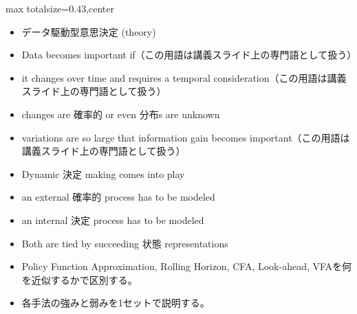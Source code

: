 \clearpage
{}
\begin{minipage}[t]{0.405\textwidth}
\begin{adjustbox}{max totalsize={\textwidth}{0.43\textheight},center}
\begin{minipage}{\textwidth}\scriptsize
{}\begin{itemize}
\item データ駆動型意思決定 (theory)
\item Data becomes important if（この用語は講義スライド上の専門語として扱う）
\item it changes over time and requires a temporal consideration（この用語は講義スライド上の専門語として扱う）
\item changes are 確率的 or even 分布s are unknown
\item variations are so large that information gain becomes important（この用語は講義スライド上の専門語として扱う）
\item Dynamic 決定 making comes into play
\item an external 確率的 process has to be modeled
\item an internal 決定 process has to be modeled
\item Both are tied by succeeding 状態 representations
\end{itemize}\begin{itemize}
\item Policy Function Approximation, Rolling Horizon, CFA, Look-ahead, VFAを何を近似するかで区別する。
\item 各手法の強みと弱みを1セットで説明する。
\end{itemize}
\end{minipage}
\end{adjustbox}
\end{minipage}\hfill
